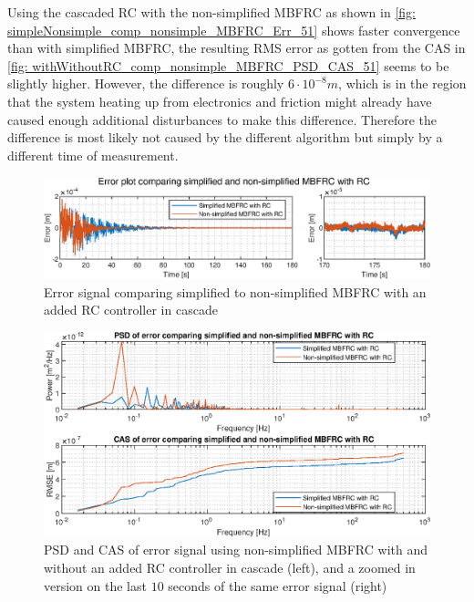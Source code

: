 \documentclass[journal]{IEEEtran}
\begin{document}
Using the cascaded RC with the non-simplified MBFRC as shown in \autoref{fig: simpleNonsimple_comp_nonsimple_MBFRC_Err_51} shows faster convergence than with simplified MBFRC, the resulting RMS error as gotten from the CAS in \autoref{fig: withWithoutRC_comp_nonsimple_MBFRC_PSD_CAS_51} seems to be slightly higher. However, the difference is roughly $6\cdot10^{-8}m$, which is in the region that the system heating up from electronics and friction might already have caused enough additional disturbances to make this difference. Therefore the difference is most likely not caused by the different algorithm but simply by a different time of measurement.

\begin{figure}
    \centering
    \includegraphics[width=1\linewidth]{figures/nonSimple_RC_MBFRC/compToSimple_48freq_Err_2.eps}
    \caption{Error signal comparing simplified to non-simplified MBFRC with an added RC controller in cascade}
    \label{fig: simpleNonsimple_comp_nonsimple_MBFRC_Err_51}
\end{figure}
\begin{figure}
    \centering
    \includegraphics[width=1\linewidth]{figures/nonSimple_RC_MBFRC/compToSimple_48freq_PSD_CAS_2.eps}
    \caption{PSD and CAS of error signal using non-simplified MBFRC with and without an added RC controller in cascade (left), and a zoomed in version on the last $10$ seconds of the same error signal (right)}
    \label{fig: withWithoutRC_comp_nonsimple_MBFRC_PSD_CAS_51}
\end{figure}
\end{document}
